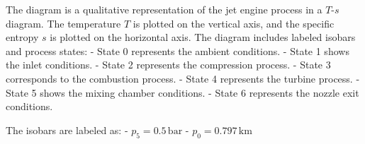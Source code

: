 The diagram is a qualitative representation of the jet engine process in a \( T \)-\( s \) diagram. The temperature \( T \) is plotted on the vertical axis, and the specific entropy \( s \) is plotted on the horizontal axis. The diagram includes labeled isobars and process states:  
- State 0 represents the ambient conditions.  
- State 1 shows the inlet conditions.  
- State 2 represents the compression process.  
- State 3 corresponds to the combustion process.  
- State 4 represents the turbine process.  
- State 5 shows the mixing chamber conditions.  
- State 6 represents the nozzle exit conditions.  

The isobars are labeled as:  
- \( p_5 = 0.5 \, \text{bar} \)  
- \( p_0 = 0.797 \, \text{km} \)